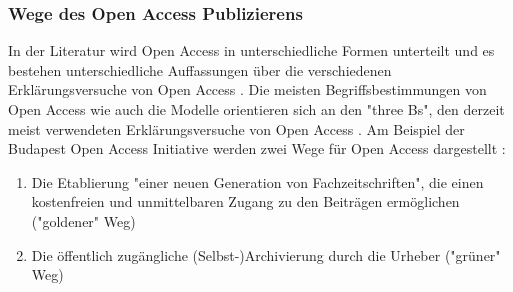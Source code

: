 \subsubsection{Wege des Open Access Publizierens}

In der Literatur wird Open Access in unterschiedliche Formen unterteilt \cite{CREATe_2014} \cite{albert_2006_open_implications} und es bestehen unterschiedliche Auffassungen über die verschiedenen Erklärungsversuche von Open Access \cite{CREATe_2014} \cite{cite:22b} \cite{lewis_2012_inevitability}. Die meisten Begriffsbestimmungen von Open Access wie auch die Modelle orientieren sich an den "three Bs", den derzeit meist verwendeten Erklärungsversuche von Open Access \cite{Adema_2014_open_access}. Am Beispiel der Budapest Open Access Initiative werden zwei Wege für Open Access dargestellt \cite{albert_2006_open_implications}:
\begin{enumerate}
\item Die Etablierung "einer neuen Generation von Fachzeitschriften", die einen kostenfreien und unmittelbaren Zugang zu den Beiträgen ermöglichen ("goldener" Weg)
\item Die öffentlich zugängliche (Selbst-)Archivierung durch die Urheber ("grüner" Weg) \cite{adema_2013_political} \cite{hall_2008_digitize}
\end{enumerate}

